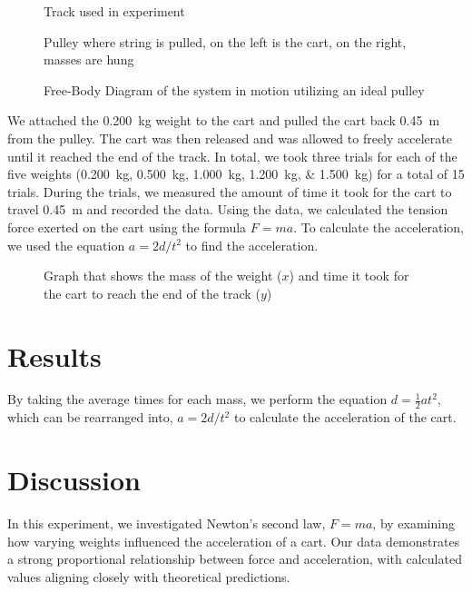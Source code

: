 ﻿\documentclass[reprint,amsmath,amssymb.aps]{revtex4-2}
\begin{document}
\begin{figure}
\caption{Track used in experiment}
\label{fig:1}
\end{figure}

\begin{figure}
\caption{Pulley where string is pulled, on the left is the cart, on the right, masses are hung}
\label{fig:2}
\end{figure}
  
\begin{figure}
\caption{Free-Body Diagram of the system in motion utilizing an ideal pulley}
\label{fig:3}
\end{figure}

We attached the \qty{0.200}{\kilo\gram} weight to the cart and pulled the cart back \qty{0.45}{\meter} from the pulley. The cart was then released and was allowed to freely accelerate until it reached the end of the track. In total, we took three trials for each of the five weights (\qtylist{0.200;0.500;1.000;1.200;1.500}{\kilo\gram}) for a total of 15 trials. During the trials, we measured the amount of time it took for the cart to travel \qty{0.45}{\meter} and recorded the data. Using the data, we calculated the tension force exerted on the cart using the formula $F=ma$. To calculate the acceleration, we used the equation $a=2d/t^2$ to find the acceleration.

\begin{figure}
\caption{Graph that shows the mass of the weight ($x$) and time it took for the cart to reach the end of the track ($y$)}
\label{fig:4}
\end{figure}





\section{Results}
By taking the average times for each mass, we perform the equation $d = \frac{1}{2} a t^2$, which can be rearranged into, $a=2d/t^2$ to calculate the acceleration of the cart.







\section{Discussion}
In this experiment, we investigated Newton’s second law, $F=ma$, by examining how varying weights influenced the acceleration of a cart. Our data demonstrates a strong proportional relationship between force and acceleration, with calculated values aligning closely with theoretical predictions.
\end{document}
